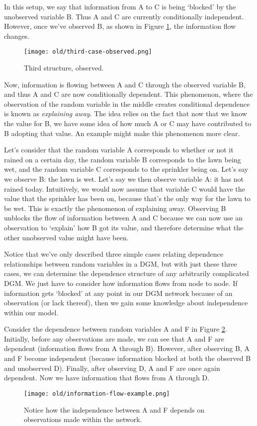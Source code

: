 In this setup, we say that information from A to C is being `blocked' by the unobserved variable B. Thus A and C are currently conditionally independent. However, once we've observed B, as shown in Figure \ref{fig:third-case-observed}, the information flow changes.
\begin{figure}
	\centering
	\texttt{[image: old/third-case-observed.png]}
	\caption{Third structure, observed.}
	\label{fig:third-case-observed}
\end{figure}

Now, information is flowing between A and C through the observed variable B, and thus A and C are now conditionally dependent. This phenomenon, where the observation of the random variable in the middle creates conditional dependence is known as \textit{explaining away}. The idea relies on the fact that now that we know the value for B, we have some idea of how much A or C may have contributed to B adopting that value. An example might make this phenomenon more clear.

Let's consider that the random variable A corresponds to whether or not it rained on a certain day, the random variable B corresponds to the lawn being wet, and the random variable C corresponds to the sprinkler being on. Let's say we observe B: the lawn is wet. Let's say we then observe variable A: it has not rained today. Intuitively, we would now assume that variable C would have the value that the sprinkler has been on, because that's the only way for the lawn to be wet. This is exactly the phenomenon of explaining away. Observing B unblocks the flow of information between A and C because we can now use an observation to `explain' how B got its value, and therefore determine what the other unobserved value might have been.

Notice that we've only described three simple cases relating dependence relationships between random variables in a DGM, but with just these three cases, we can determine the dependence structure of any arbitrarily complicated DGM. We just have to consider how information flows from node to node. If information gets `blocked' at any point in our DGM network because of an observation (or lack thereof), then we gain some knowledge about independence within our model.

Consider the dependence between random variables A and F in Figure \ref{fig:information-flow-example}. Initially, before any observations are made, we can see that A and F are dependent (information flows from A through B). However, after observing B, A and F become independent (because information blocked at both the observed B and unobserved D). Finally, after observing D, A and F are once again dependent. Now we have information that flows from A through D.
\begin{figure}
	\centering
	\texttt{[image: old/information-flow-example.png]}
    \caption{Notice how the independence between A and F depends on observations made within the network.}
	\label{fig:information-flow-example}
\end{figure}

